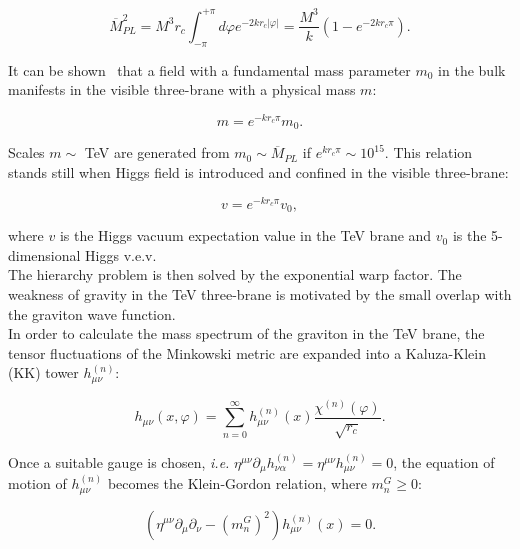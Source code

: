 \begin{equation}
\overline{M}_{PL}^2 = M^3 r_c \int_{-\pi}^{+\pi} d \varphi e^{-2 k r_c \left| \varphi \right|} = \frac{M^3}{k} \left( 1 - e^{-2 k r_c \pi} \right).
\label{eq:theory_effective_planck_mass}
\end{equation}

\noindent It can be shown~\cite{Randall:1999ee} that a field with a fundamental mass parameter $m_0$ in the bulk manifests in the visible three-brane with a physical mass $m$:

\begin{equation}
m = e^{- k r_c \pi} m_0.
\label{eq:theory_effective_masses}
\end{equation}

\noindent Scales $m \sim$ TeV are generated from $m_0 \sim \overline{M}_{PL}$ if $e^{k r_c \pi} \sim 10^{15}$. This relation stands still when Higgs field is introduced and confined in the visible three-brane:

\begin{equation}
v = e^{- k r_c \pi} v_0,
\label{eq:theory_effective_Higgs_vev}
\end{equation}

\noindent where $v$ is the Higgs vacuum expectation value in the TeV brane and $v_0$ is the 5-dimensional Higgs v.e.v.\\
The hierarchy problem is then solved by the exponential warp factor. The weakness of gravity in the TeV three-brane is motivated by the small overlap with the graviton wave function.\\
In order to calculate the mass spectrum of the graviton in the TeV brane, the tensor fluctuations of the Minkowski metric are expanded into a Kaluza-Klein (KK) tower $h_{\mu \nu}^{(n)}$:

\begin{equation}
h_{\mu \nu}(x, \varphi) = \sum_{n=0}^{\infty} h_{\mu \nu}^{(n)}(x) \frac{\chi^{(n)}(\varphi)}{\sqrt{r_c}}.
\label{eq:theory_RS_KK_tower}
\end{equation}

\noindent Once a suitable gauge is chosen, \textit{i.e.} $\eta^{\mu \nu} \partial_{\mu} h_{\nu \alpha}^{(n)} = \eta^{\mu \nu} h_{\mu \nu}^{(n)} = 0$, the equation of motion of $h_{\mu \nu}^{(n)}$ becomes the Klein-Gordon relation, where $m_n^G \geq 0$:

\begin{equation}
\left( \eta^{\mu \nu} \partial_{\mu} \partial_{\nu} - (m_n^G)^2 \right) h_{\mu \nu}^{(n)}(x)= 0.
\label{eq:theory_RS_KK_KleinGordon}
\end{equation}


